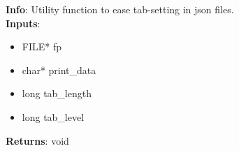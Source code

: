 \textbf{Info}: Utility function to ease tab-setting in json files. \\

\noindent \textbf{Inputs}:
\begin{itemize}
\item{FILE* fp}
\item{char* print\_data}
\item{long tab\_length}
\item{long tab\_level}
\end{itemize}

\noindent \textbf{Returns}: void
